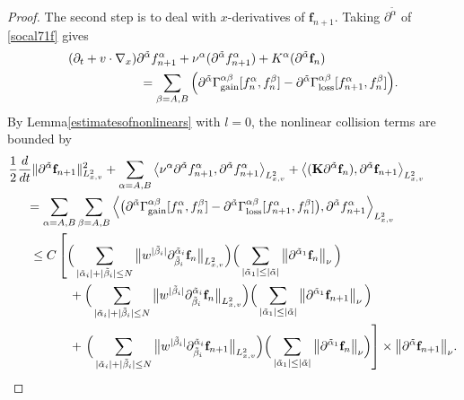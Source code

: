 \documentclass[reqno]{amsart}
\numberwithin{equation}{section}
\numberwithin{equation}{section}
\begin{document}
\begin{proof}
		The second step is to deal with  $x$-derivatives of $\mathbf{f}_{n+1}$. Taking $\partial^{\tilde{\alpha}}$ of \eqref{socal71f} gives
		\begin{align}
		&(\partial_t + v \cdot \nabla_x) \partial^{\tilde{\alpha}} f_{n+1}^\alpha + \nu^{\alpha} (\partial^{\tilde{\alpha}} f_{n+1}^\alpha) + K^\alpha(\partial^{\tilde{\alpha}} \mathbf{f}_{n}) \notag\\
		&\hspace{2cm}= \sum_{\beta=A,B}\Big(\partial^{\tilde{\alpha}} \Gamma^{\alpha\beta}_{\text{gain}}[f^{\alpha}_n, f^{\beta}_n] - \partial^{\tilde{\alpha}} \Gamma^{\alpha\beta}_{\text{loss}}[f^{\alpha}_{n+1}, f^{\beta}_n]\Big).
		\end{align}
		By Lemma\ref{estimatesofnonlinears} with $l = 0$, the nonlinear collision terms are bounded by
		\begin{align}
		&\frac{1}{2}\frac{d}{dt}\|\partial^{\tilde{\alpha}} \mathbf{f}_{n+1}\|^2_{L^{2}_{x,v}} + \sum_{\alpha=A,B}\left\langle \nu^{\alpha}\partial^{\tilde{\alpha}} f_{n+1}^{\alpha}, \partial^{\tilde{\alpha}} f_{n+1}^{\alpha} \right\rangle_{L^{2}_{x,v}} + \left\langle  (\mathbf{K}\partial^{\tilde{\alpha}} \mathbf{f}_n), \partial^{\tilde{\alpha}} \mathbf{f}_{n+1}\right\rangle_{L^{2}_{x,v}}  \notag\\
		&\hspace{0.5cm}= \sum_{\alpha=A,B}\sum_{\beta=A,B}\left\langle \big( \partial^{\tilde{\alpha}}\Gamma^{\alpha\beta}_{\text{gain}}[f_n^{\alpha}, f_n^{\beta}] - \partial^{\tilde{\alpha}}\Gamma^{\alpha\beta}_{\text{loss}}[f_{n+1}^{\alpha}, f_{n}^{\beta}]\big), \partial^{\tilde{\alpha}} f^{\alpha}_{n+1}\right\rangle_{L^{2}_{x,v}} \notag\\
		&\hspace{0.6cm}\le C\left[\Big(\sum_{| \tilde{\alpha}_i |+| \tilde{\beta}_i | \leq N} \big\| w^{| \tilde{\beta}_i |} \partial_{\tilde{\beta}_i}^{\tilde{\alpha}_i} \mathbf{f}_{n}\big\|_{L^{2}_{x,v}}\Big)\Big(\sum_{| \tilde{\alpha}_1 | \leq | \tilde{\alpha} |} \left\|  \partial^{\tilde{\alpha}_1} \mathbf{f}_{n}\right\|_{\nu}\Big)\right. \notag\\
		&\hspace{1.7cm} + \Big(\sum_{| \tilde{\alpha}_i |+| \tilde{\beta}_i | \leq N} \big\| w^{| \tilde{\beta}_i |} \partial_{\tilde{\beta}_i}^{\tilde{\alpha}_i} \mathbf{f}_{n}\big\|_{L^{2}_{x,v}}\Big)\Big(\sum_{| \tilde{\alpha}_1 | \leq | \tilde{\alpha} |} \left\|  \partial^{\tilde{\alpha}_1} \mathbf{f}_{n+1}\right\|_{\nu}\Big) \notag\\
		&\hspace{1.7cm} + \left.\Big(\sum_{| \tilde{\alpha}_i |+| \tilde{\beta}_i | \leq N} \big\| w^{| \tilde{\beta}_i |} \partial_{\tilde{\beta}_i}^{\tilde{\alpha}_i} \mathbf{f}_{n+1}\big\|_{L^{2}_{x,v}}\Big)\Big(\sum_{| \tilde{\alpha}_1 | \leq | \tilde{\alpha} |} \big\| \partial^{\tilde{\alpha}_1} \mathbf{f}_{n}\big\|_{\nu}\Big) \right] \times \big\|\partial^{\tilde{\alpha}} \mathbf{f}_{n+1}\big\|_{\nu}.\notag

\end{align}
\end{proof}
\end{document}
